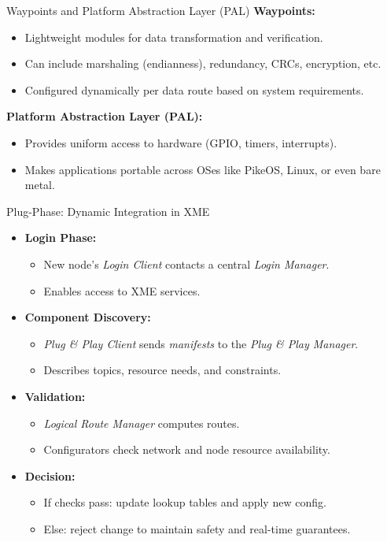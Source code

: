 \documentclass{beamer}
\begin{document}
\begin{frame}{Waypoints and Platform Abstraction Layer (PAL)}
  \textbf{Waypoints:}
  \begin{itemize}
    \item Lightweight modules for data transformation and verification.
    \item Can include marshaling (endianness), redundancy, CRCs, encryption, etc.
    \item Configured dynamically per data route based on system requirements.
  \end{itemize}
  \textbf{Platform Abstraction Layer (PAL):}
  \begin{itemize}
    \item Provides uniform access to hardware (GPIO, timers, interrupts).
    \item Makes applications portable across OSes like PikeOS, Linux, or even bare metal.
  \end{itemize}
\end{frame}

\begin{frame}{Plug-Phase: Dynamic Integration in XME}
  \begin{itemize}
    \item \textbf{Login Phase:}
    \begin{itemize}
      \item New node’s \textit{Login Client} contacts a central \textit{Login Manager}.
      \item Enables access to XME services.
    \end{itemize}

    \item \textbf{Component Discovery:}
    \begin{itemize}
      \item \textit{Plug \& Play Client} sends \textit{manifests} to the \textit{Plug \& Play Manager}.
      \item Describes topics, resource needs, and constraints.
    \end{itemize}

    \item \textbf{Validation:}
    \begin{itemize}
      \item \textit{Logical Route Manager} computes routes.
      \item Configurators check network and node resource availability.
    \end{itemize}

    \item \textbf{Decision:}
    \begin{itemize}
      \item If checks pass: update lookup tables and apply new config.
      \item Else: reject change to maintain safety and real-time guarantees.
    \end{itemize}
  \end{itemize}
\end{frame}
\end{document}
